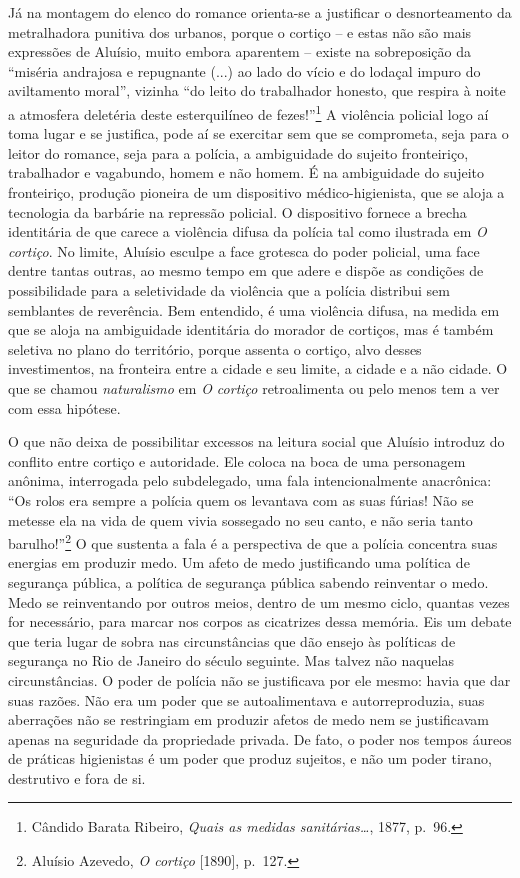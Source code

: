 Já na montagem do elenco do romance orienta-se a justificar o
desnorteamento da metralhadora punitiva dos urbanos, porque o cortiço --
e estas não são mais expressões de Aluísio, muito embora aparentem --
existe na sobreposição da ``miséria andrajosa e repugnante (...) ao lado
do vício e do lodaçal impuro do aviltamento moral'', vizinha ``do leito
do trabalhador honesto, que respira à noite a atmosfera deletéria deste
esterquilíneo de fezes!''\footnote{Cândido Barata Ribeiro, \emph{Quais
  as medidas sanitárias\ldots{}}, 1877, p.~96.} A violência policial
logo aí toma lugar e se justifica, pode aí se exercitar sem que se
comprometa, seja para o leitor do romance, seja para a polícia, a
ambiguidade do sujeito fronteiriço, trabalhador e vagabundo, homem e não
homem. É na ambiguidade do sujeito fronteiriço, produção pioneira de um
dispositivo médico-higienista, que se aloja a tecnologia da barbárie na
repressão policial. O dispositivo fornece a brecha identitária de que
carece a violência difusa da polícia tal como ilustrada em \emph{O
cortiço}. No limite, Aluísio esculpe a face grotesca do poder policial,
uma face dentre tantas outras, ao mesmo tempo em que adere e dispõe as
condições de possibilidade para a seletividade da violência que a
polícia distribui sem semblantes de reverência. Bem entendido, é uma
violência difusa, na medida em que se aloja na ambiguidade identitária
do morador de cortiços, mas é também seletiva no plano do território,
porque assenta o cortiço, alvo desses investimentos, na fronteira entre
a cidade e seu limite, a cidade e a não cidade. O que se chamou
\emph{naturalismo} em \emph{O cortiço} retroalimenta ou pelo menos tem a
ver com essa hipótese.

O que não deixa de possibilitar excessos na leitura social que Aluísio
introduz do conflito entre cortiço e autoridade. Ele coloca na boca de
uma personagem anônima, interrogada pelo subdelegado, uma fala
intencionalmente anacrônica: ``Os rolos era sempre a polícia quem os
levantava com as suas fúrias! Não se metesse ela na vida de quem vivia
sossegado no seu canto, e não seria tanto barulho!''\footnote{Aluísio
  Azevedo, \emph{O cortiço} {[}1890{]}, p.~127.} O que sustenta a fala é
a perspectiva de que a polícia concentra suas energias em produzir medo.
Um afeto de medo justificando uma política de segurança pública, a
política de segurança pública sabendo reinventar o medo. Medo se
reinventando por outros meios, dentro de um mesmo ciclo, quantas vezes
for necessário, para marcar nos corpos as cicatrizes dessa memória. Eis
um debate que teria lugar de sobra nas circunstâncias que dão ensejo às
políticas de segurança no Rio de Janeiro do século seguinte. Mas talvez
não naquelas circunstâncias. O poder de polícia não se justificava por
ele mesmo: havia que dar suas razões. Não era um poder que se
autoalimentava e autorreproduzia, suas aberrações não se restringiam em
produzir afetos de medo nem se justificavam apenas na seguridade da
propriedade privada. De fato, o poder nos tempos áureos de práticas
higienistas é um poder que produz sujeitos, e não um poder tirano,
destrutivo e fora de si.

